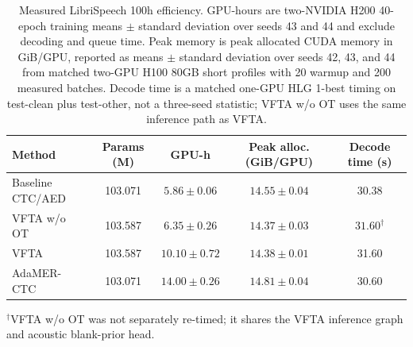 
\begin{table}[t]
  \centering
  \small
  \caption{Measured LibriSpeech 100h efficiency. GPU-hours are two-NVIDIA H200
  40-epoch training means $\pm$ standard deviation over seeds 43 and 44 and
  exclude decoding and queue time. Peak memory is peak allocated CUDA memory in
  GiB/GPU, reported as means $\pm$ standard deviation over seeds 42, 43, and 44
  from matched two-GPU H100 80GB short profiles with 20 warmup and 200 measured
  batches. Decode time is a matched one-GPU HLG 1-best timing on test-clean plus
  test-other, not a three-seed statistic; VFTA w/o OT uses the same inference
  path as VFTA.}
  \label{tab:libri100_training_cost}
  \setlength{\tabcolsep}{3.5pt}
  \begin{tabular}{lcccc}
    \toprule[1.1pt]
    Method & Params (M) & GPU-h & Peak alloc. (GiB/GPU) & Decode time (s) \\
    \midrule
    Baseline CTC/AED
      & 103.071 & $5.86 \pm 0.06$ & $14.55 \pm 0.04$ & 30.38 \\
    VFTA w/o OT
      & 103.587 & $6.35 \pm 0.26$ & $14.37 \pm 0.03$ & $31.60^\dagger$ \\
    VFTA
      & 103.587 & $10.10 \pm 0.72$ & $14.38 \pm 0.01$ & 31.60 \\
    AdaMER-CTC
      & 103.071 & $14.00 \pm 0.26$ & $14.81 \pm 0.04$ & 30.60 \\
    \bottomrule[1.1pt]
  \end{tabular}
  \vspace{1mm}
  \footnotesize{$^\dagger$VFTA w/o OT was not separately re-timed; it shares
  the VFTA inference graph and acoustic blank-prior head.}
\end{table}
